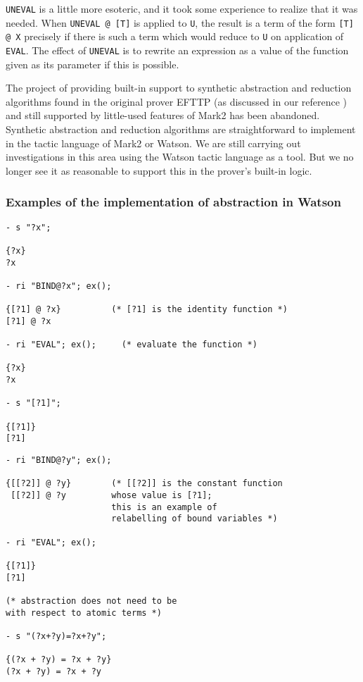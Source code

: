 \documentclass{kluwer}
\begin{document}
\begin{article}
{\tt UNEVAL} is a little more esoteric, and it took some experience to
realize that it was needed.  When {\tt UNEVAL @ [T]} is applied to
{\tt U}, the result is a term of the form {\tt [T] @ X} precisely if
there is such a term which would reduce to {\tt U} on application of
{\tt EVAL}.  The effect of {\tt UNEVAL} is to rewrite an expression as
a value of the function given as its parameter if this is possible.

The project of providing built-in support to synthetic abstraction and
reduction algorithms found in the original prover EFTTP (as discussed
in our reference \cite{eft}) and still supported by little-used
features of Mark2 has been abandoned.  Synthetic abstraction and
reduction algorithms are straightforward to implement in the tactic
language of Mark2 or Watson.  We are still carrying out investigations
in this area using the Watson tactic language as a tool.  But we no
longer see it as reasonable to support this in the prover's built-in
logic.

\subsubsection{Examples of the implementation of abstraction in Watson}

\begin{verbatim}
- s "?x";

{?x}
?x

- ri "BIND@?x"; ex();

{[?1] @ ?x}          (* [?1] is the identity function *)
[?1] @ ?x

- ri "EVAL"; ex();     (* evaluate the function *)

{?x}
?x

- s "[?1]";

{[?1]}
[?1]
\end{verbatim}
\newpage
\begin{verbatim}
- ri "BIND@?y"; ex();

{[[?2]] @ ?y}        (* [[?2]] is the constant function 
 [[?2]] @ ?y         whose value is [?1];
                     this is an example of 
                     relabelling of bound variables *)

- ri "EVAL"; ex();

{[?1]}
[?1]

(* abstraction does not need to be 
with respect to atomic terms *)

- s "(?x+?y)=?x+?y";

{(?x + ?y) = ?x + ?y}
(?x + ?y) = ?x + ?y


\end{verbatim}
\end{article}
\end{document}
